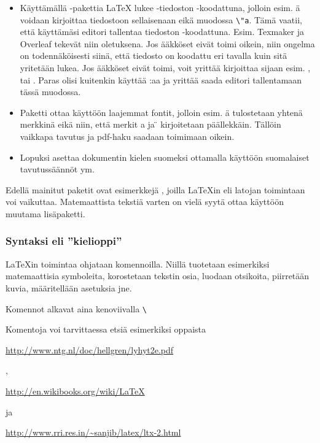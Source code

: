 \begin{frame}[fragile]
    \begin{extra}
        \begin{itemize}
            \item Käyttämällä -pakettia \LaTeX{} lukee -tiedoston -koodattuna, jolloin esim. ä voidaan kirjoittaa tiedostoon sellaisenaan eikä muodossa \lstinline-\"a-. Tämä vaatii, että käyttämäsi editori tallentaa tiedoston -koodattuna. Esim. Texmaker ja Overleaf tekevät niin oletuksena. Jos ääkköset eivät toimi oikein, niin ongelma on todennäköisesti siinä, että tiedosto on koodattu eri tavalla kuin sitä yritetään lukea. Jos ääkköset eivät toimi, voit yrittää kirjoittaa \cns{[utf8]} sijaan esim. \cns{[latin1]}, \cns{[ansinew]} tai \cns{[applemac]}. Paras olisi kuitenkin käyttää \cns{[utf8]}:aa ja yrittää saada editori tallentamaan tässä muodossa.
            \item Paketti  ottaa käyttöön laajemmat fontit, jolloin esim. ä tulostetaan yhtenä merkkinä eikä niin, että merkit a ja \"{} kirjoitetaan päällekkäin. Tällöin vaikkapa tavutus ja pdf-haku saadaan toimimaan oikein.
            \item Lopuksi  asettaa dokumentin kielen suomeksi ottamalla käyttöön suomalaiset tavutussäännöt ym.
        \end{itemize}
    \end{extra}
\end{frame}

\begin{frame}[fragile]
    
\end{frame}

\begin{frame}[fragile]
    Edellä mainitut paketit ovat esimerkkejä , joilla \LaTeX in eli latojan toimintaan voi vaikuttaa. 
    \pause
    Matemaattista tekstiä varten on vielä syytä ottaa käyttöön muutama lisäpaketti. 
    
\end{frame}

\begin{frame}[fragile]
    \frametitle{Syntaksi eli ''kielioppi''}
    \LaTeX in toimintaa ohjataan komennoilla. \pause Niillä tuotetaan esimerkiksi matemaattisia symboleita, korostetaan tekstin osia, luodaan otsikoita, piirretään kuvia, määritellään asetuksia jne.  \pause
    \begin{framed}
        Komennot alkavat aina kenoviivalla \lstinline-\-
    \end{framed}
    \pause
    Komentoja voi tarvittaessa etsiä esimerkiksi oppaista \begin{scriptsize}
        \url{http://www.ntg.nl/doc/hellgren/lyhyt2e.pdf}
    \end{scriptsize},
    \begin{scriptsize}
        \url{http://en.wikibooks.org/wiki/LaTeX}
    \end{scriptsize} ja
    \begin{scriptsize}
        \url{http://www.rri.res.in/~sanjib/latex/ltx-2.html}
    \end{scriptsize}
\end{frame}


